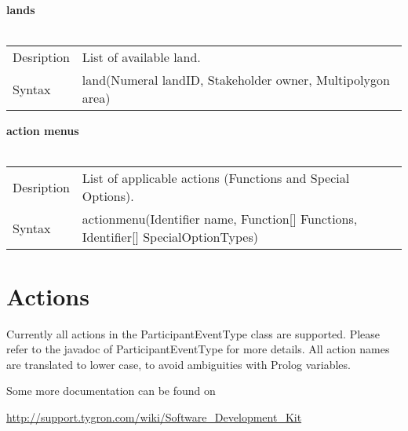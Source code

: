 \documentclass[english,11pt]{article}
\begin{document}
\textbf{lands}\\
\\
\begin{tabularx}{\textwidth}{lX}
 Desription & List of available land. \\
 Syntax & land(Numeral landID, Stakeholder owner, Multipolygon area) \\
\end{tabularx}
\newline

\textbf{action menus}\\
\\
\begin{tabularx}{\textwidth}{lX}
 Desription & List of applicable actions (Functions and Special Options). \\
 Syntax & actionmenu(Identifier name, Function[] Functions, Identifier[] SpecialOptionTypes) \\
\end{tabularx}
\newline

\section{Actions}

Currently all actions in the ParticipantEventType class are supported. Please refer to the javadoc of ParticipantEventType for more details. All action names are translated to lower case, to avoid ambiguities with Prolog variables.

Some more documentation can be found on

\url{http://support.tygron.com/wiki/Software_Development_Kit}
\end{document}
